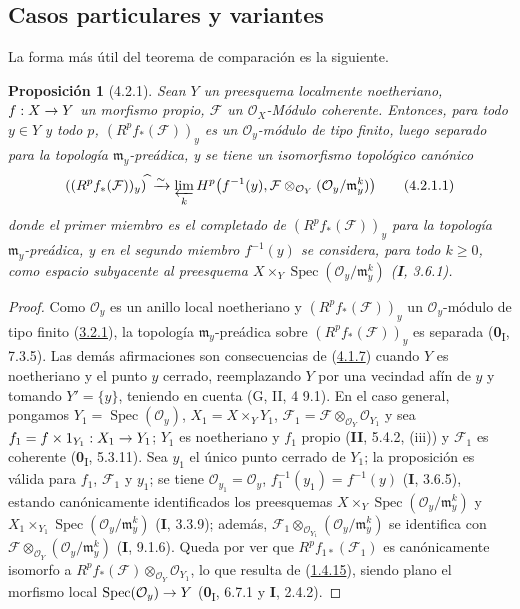 \documentclass[10pt,oneside,openany]{book}
\theoremstyle{egaenv}\newtheorem*{env}{---}
\theoremstyle{egastatement}
\newtheorem*{proposition}{Proposición}
\theoremstyle{egadescription}
\newcommand{\oldpage}[2][]{\marginnote{\normalfont\scriptsize\textbf{#1}\,|\,#2}\ignorespaces}
\renewcommand{\geq}{\geqslant}
\renewcommand{\to}{\mathchoice{\longrightarrow}{\rightarrow}{\rightarrow}{\rightarrow}}
\begin{document}
\subsection{Casos particulares y variantes}
\label{subsection:III.4.2}
\label{subsection:III.4.2-fr}

La forma más útil del teorema de comparación  es la
siguiente.

\begin{proposition}[4.2.1]
\label{III.4.2.1-fr}
Sean $Y$ un preesquema localmente noetheriano, $f:X\to Y$ un morfismo
propio, $\mathcal F$ un $\mathcal O_X$-Módulo coherente. Entonces, para todo
$y\in Y$ y todo $p$, $(R^pf_*(\mathcal F))_y$ es
\oldpage[III]{130}
un $\mathcal O_y$-módulo de tipo finito, luego separado para la topología
$\mathfrak m_y$-preádica, y se tiene un isomorfismo topológico canónico
\[
((R^pf_*(\mathcal F))_y)^{\widehat{\,}}
\xrightarrow{\sim}
\varprojlim_kH^p\bigl(f^{-1}(y),
\mathcal F\otimes_{\mathcal O_Y}(\mathcal O_y/\mathfrak m_y^k)\bigr)
\tag{4.2.1.1}\label{III.4.2.1.1-fr}
\]
donde el primer miembro es el completado de $(R^pf_*(\mathcal F))_y$ para la
topología $\mathfrak m_y$-preádica, y en el segundo miembro $f^{-1}(y)$ se
considera, para todo $k\geq0$, como espacio subyacente al preesquema
$X\times_Y\operatorname{Spec}(\mathcal O_y/\mathfrak m_y^k)$
\textup{(\textbf{I}, 3.6.1)}.
\end{proposition}

\begin{proof}
Como $\mathcal O_y$ es un anillo local noetheriano y
$(R^pf_*(\mathcal F))_y$ un $\mathcal O_y$-módulo de tipo finito
(\hyperref[III.3.2.1-fr]{3.2.1}), la topología $\mathfrak m_y$-preádica
sobre $(R^pf_*(\mathcal F))_y$ es separada (\textbf{0}\textsubscript{I}, 7.3.5). Las
demás afirmaciones son consecuencias de (\hyperref[III.4.1.7-fr]{4.1.7})
cuando $Y$ es noetheriano y el punto $y$ cerrado, reemplazando $Y$ por una
vecindad afín de $y$ y tomando $Y'=\{y\}$, teniendo en cuenta
(G, II, 4 9.1). En el caso general, pongamos
$Y_1=\operatorname{Spec}(\mathcal O_y)$, $X_1=X\times_YY_1$,
$\mathcal F_1=\mathcal F\otimes_{\mathcal O_Y}\mathcal O_{Y_1}$
y sea $f_1=f\times1_{Y_1}:X_1\to Y_1$; $Y_1$ es noetheriano y $f_1$
propio (\textbf{II}, 5.4.2, (iii)) y $\mathcal F_1$ es coherente
(\textbf{0}\textsubscript{I}, 5.3.11). Sea $y_1$ el único punto cerrado de $Y_1$;
la proposición es válida para $f_1$, $\mathcal F_1$ y $y_1$; se tiene
$\mathcal O_{y_1}=\mathcal O_y$, $f_1^{-1}(y_1)=f^{-1}(y)$ (\textbf{I}, 3.6.5),
estando canónicamente identificados los preesquemas
$X\times_Y\operatorname{Spec}(\mathcal O_y/\mathfrak m_y^k)$ y
$X_1\times_{Y_1}\operatorname{Spec}(\mathcal O_y/\mathfrak m_y^k)$
(\textbf{I}, 3.3.9); además,
$\mathcal F_1\otimes_{\mathcal O_{Y_1}}
(\mathcal O_y/\mathfrak m_y^k)$ se identifica con
$\mathcal F\otimes_{\mathcal O_Y}(\mathcal O_y/\mathfrak m_y^k)$
(\textbf{I}, 9.1.6). Queda por ver que $R^pf_{1*}(\mathcal F_1)$ es
canónicamente isomorfo a
$R^pf_*(\mathcal F)\otimes_{\mathcal O_Y}\mathcal O_{Y_1}$, lo que
resulta de (\hyperref[III.1.4.15-fr]{1.4.15}), siendo plano el morfismo local
$\operatorname{Spec}(\mathcal O_y)\to Y$
(\textbf{0}\textsubscript{I}, 6.7.1 y \textbf{I}, 2.4.2).
\end{proof}
\end{document}
